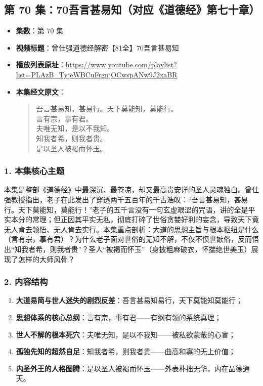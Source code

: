 \clearpage

\subsection{第 70 集：70吾言甚易知（对应《道德经》第七十章）}
\label{sec:ep70}

\begin{itemize}
    \item \textbf{集数}：第 70 集
    \item \textbf{视频标题}：曾仕强道德经解密【81全】70吾言甚易知
    \item \textbf{播放列表原址}：\url{https://www.youtube.com/playlist?list=PLAzB_TyjeWBCuFrgnjOCwspANw9J2xaBR}
    \item \textbf{本集经文原文}：
    \begin{quote}\kaishu
    吾言甚易知，甚易行。天下莫能知，莫能行。\\
    言有宗，事有君。\\
    夫唯无知，是以不我知。\\
    知我者希，则我者贵。\\
    是以圣人被褐而怀玉。
    \end{quote}
\end{itemize}

\subsubsection{1. 本集核心主题}
本集是整部《道德经》中最深沉、最苍凉，却又最高贵安详的圣人灵魂独白。曾仕强教授指出，老子在此发出了穿透两千五百年的千古浩叹：“吾言甚易知，甚易行。天下莫能知，莫能行！”老子的五千言没有一句玄虚艰涩的咒语，讲的全是平实本分的常理；但正因其平实无私，彻底打碎了世俗贪婪好利的妄念，导致天下竟无人肯去领悟、无人肯去实行。本集重点剖析：大道的思想主旨与根本枢纽是什么（言有宗，事有君）？为什么老子面对世俗的无知不解，不仅不愤世嫉俗，反而悟出“知我者希，则我者贵”？圣人“被褐而怀玉”（身披粗麻破衣，怀揣绝世美玉）展现了怎样的大师风骨？

\subsubsection{2. 内容结构}
\begin{enumerate}
    \item \textbf{大道易简与世人迷失的剧烈反差}：吾言甚易知易行，天下莫能知莫能行；
    \item \textbf{思想体系的核心总纲}：言有宗，事有君——有纲有领的系统真理；
    \item \textbf{世人不解的根本死穴}：夫唯无知，是以不我知——被私欲蒙蔽的心盲；
    \item \textbf{孤独先知的超然自足}：知我者希，则我者贵——曲高和寡的无上价值；
    \item \textbf{内圣外王的人格图腾}：是以圣人被褐而怀玉——外表朴拙无华，内在品德通天。
\end{enumerate}

